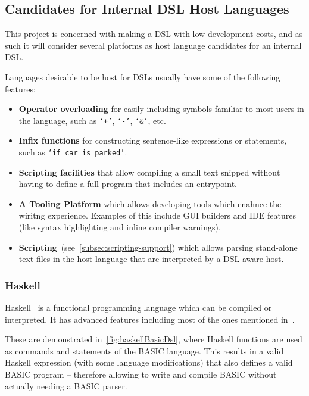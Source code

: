 
\subsection{Candidates for Internal DSL Host Languages}\label{subsec:dsl-host-candidates}

This project is concerned with making a DSL with low development costs, and as such it will consider several platforms as host language candidates for an internal DSL\@.
\begin{definition}
    \label{def:host-lang-requirements}
    Languages desirable to be host for DSLs usually have some of the following features:
    \begin{itemize}
        \item \textbf{Operator overloading} for easily including symbols familiar to most users in the language, such as \texttt{`+'}, \texttt{`-'}, \texttt{`\&'}, etc.
        \item \textbf{Infix functions} for constructing sentence-like expressions or statements, such as \texttt{`if car is parked'}.
        \item \textbf{Scripting facilities} that allow compiling a small text snipped without having to define a full program that includes an entrypoint.
        \item \textbf{A Tooling Platform} which allows developing tools which enahnce the wiritng experience.
        Examples of this include GUI builders and IDE features (like syntax highlighting and inline compiler warnings).
        \item \textbf{Scripting}~(see~\autoref{subsec:scripting-support}) which allows parsing stand-alone text files in the host language that are interpreted by a DSL-aware host.
    \end{itemize}

\end{definition}

\subsubsection{Haskell}

Haskell~\cite{haskellDocs} is a functional programming language which can be compiled or interpreted.
It has advanced features including most of the ones mentioned in~.

These are demonstrated in~\autoref{fig:haskellBasicDsl}, where Haskell functions are used as commands and statements of the BASIC language.
This results in a valid Haskell expression (with some language modifications) that also defines a valid BASIC program -- therefore allowing to write and compile BASIC without actually needing a BASIC parser.

